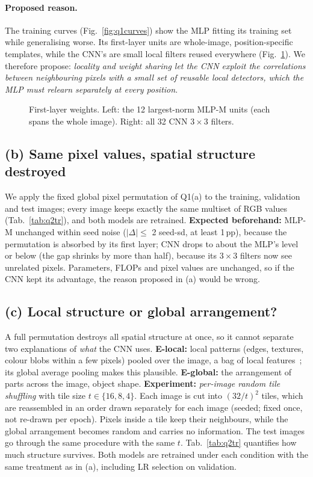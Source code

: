 \paragraph{Proposed reason.} The training curves (Fig.~\ref{fig:q1curves}) show the MLP fitting its training set while
generalising worse. Its first-layer units are whole-image, position-specific templates, while the CNN's are small local
filters reused everywhere (Fig.~\ref{fig:q2weights}). We therefore propose: \emph{locality and weight sharing let the CNN
exploit the correlations between neighbouring pixels with a small set of reusable local detectors, which the MLP must
relearn separately at every position}.

\begin{figure}[t]
\centering
{}
\caption{First-layer weights. Left: the 12 largest-norm MLP-M units (each spans the whole image). Right: all 32 CNN
$3{\times}3$ filters.}
\label{fig:q2weights}
\end{figure}

\subsection{(b) Same pixel values, spatial structure destroyed}
We apply the fixed global pixel permutation of Q1(a) to the training, validation and test images; every image keeps
exactly the same multiset of RGB values (Tab.~\ref{tab:q2tr}), and both models are retrained. \textbf{Expected beforehand:}
MLP-M unchanged within seed noise ($|\Delta|\leq$ 2 seed-sd, at least 1\,pp), because the permutation is absorbed by its
first layer; CNN drops to about the MLP's level or below (the gap shrinks by more than half), because its $3{\times}3$ filters
now see unrelated pixels. Parameters, FLOPs and pixel values are unchanged, so if the CNN kept its advantage, the reason
proposed in (a) would be wrong.

\subsection{(c) Local structure or global arrangement?}
A full permutation destroys all spatial structure at once, so it cannot separate two explanations of \emph{what} the CNN
uses. \textbf{E-local:} local patterns (edges, textures, colour blobs within a few pixels) pooled over the image, \ie a
bag of local features~\cite{brendel2019approximating}; its global average pooling makes this plausible. \textbf{E-global:} the
arrangement of parts across the image, \ie object shape. \textbf{Experiment:} \emph{per-image random tile shuffling} with
tile size $t\in\{16,8,4\}$. Each image is cut into $(32/t)^2$ tiles, which are reassembled in an order drawn separately
for each image (seeded; fixed once, not re-drawn per epoch). Pixels inside a tile keep their neighbours, while the
global arrangement becomes random and carries no information. The test images go through the same procedure with the
same $t$. Tab.~\ref{tab:q2tr} quantifies how much structure survives. Both models are retrained under each condition with
the same treatment as in (a), including LR selection on validation.

